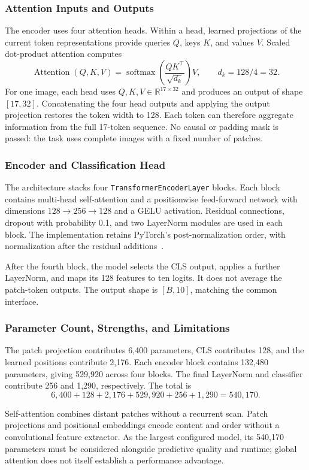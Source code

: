 \subsubsection{Attention Inputs and Outputs}

The encoder uses four attention heads. Within a head, learned projections of the current token representations provide queries $Q$, keys $K$, and values $V$. Scaled dot-product attention computes~\cite{vaswani2017attention}
\begin{equation}
    \operatorname{Attention}(Q,K,V)
    =\operatorname{softmax}\!\left(\frac{QK^{\top}}{\sqrt{d_k}}\right)V,
    \qquad d_k=128/4=32.
\end{equation}
For one image, each head uses $Q,K,V\in\mathbb{R}^{17\times32}$ and produces an output of shape $[17,32]$. Concatenating the four head outputs and applying the output projection restores the token width to 128. Each token can therefore aggregate information from the full 17-token sequence. No causal or padding mask is passed: the task uses complete images with a fixed number of patches.

\subsubsection{Encoder and Classification Head}

The architecture stacks four \texttt{TransformerEncoderLayer} blocks. Each block contains multi-head self-attention and a positionwise feed-forward network with dimensions $128\to256\to128$ and a GELU activation. Residual connections, dropout with probability 0.1, and two LayerNorm modules are used in each block. The implementation retains PyTorch's post-normalization order, with normalization after the residual additions~\cite{pytorch-transformer-layer}.

After the fourth block, the model selects the CLS output, applies a further LayerNorm, and maps its 128 features to ten logits. It does not average the patch-token outputs. The output shape is $[B,10]$, matching the common interface.

\subsubsection{Parameter Count, Strengths, and Limitations}

The patch projection contributes 6,400 parameters, CLS contributes 128, and the learned positions contribute 2,176. Each encoder block contains 132,480 parameters, giving 529,920 across four blocks. The final LayerNorm and classifier contribute 256 and 1,290, respectively. The total is
\begin{equation}
    6{,}400+128+2{,}176+529{,}920+256+1{,}290=540{,}170.
\end{equation}

Self-attention combines distant patches without a recurrent scan. Patch projections and positional embeddings encode content and order without a convolutional feature extractor. As the largest configured model, its 540,170 parameters must be considered alongside predictive quality and runtime; global attention does not itself establish a performance advantage.

